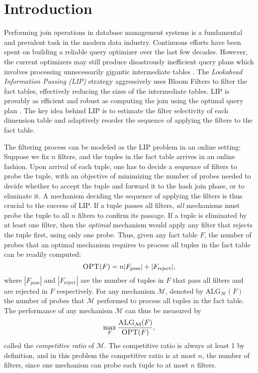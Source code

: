 
\section{Introduction}

Performing join operations in database management systems is a fundamental and prevalent task in the modern data industry. Continuous efforts have been spent on building a reliable query optimizer over the last few decades. However, the current optimizers may still produce disastrously inefficient query plans which involves processing unnecessarily gigantic intermediate tables \cite{leis2015good,rabl2013variations}. The \textit{Lookahead Information Passing (LIP)} strategy aggressively uses Bloom Filters to filter the fact tables, effectively reducing the sizes of the intermediate tables. LIP is provably as efficient and robust as computing the join using the optimal query plan \cite{zhu2017looking}. The key idea behind LIP is to estimate the filter selectivity of each dimension table and adaptively reorder the sequence of applying the filters to the fact table. 


The filtering process can be modeled as the \textsc{LIP} problem in an online setting: Suppose we fix $n$ filters, and the tuples in the fact table arrives in an online fashion. Upon arrival of each tuple, one has to decide a sequence of filters to probe the tuple, with an objective of minimizing the number of probes needed to decide whether to accept the tuple and forward it to the hash join phase, or to eliminate it. A mechanism deciding the sequence of applying the filters is thus crucial to the success of LIP. If a tuple passes all filters, \textit{all} mechanisms must probe the tuple to all $n$ filters to confirm its passage. If a tuple is eliminated by at least one filter, then the \textit{optimal} mechanism would apply any filter that rejects the tuple first, using only one probe. Thus, given any fact table $F$, the number of probes that an optimal mechanism requires to process all tuples in the fact table can be readily computed: 
\[
	\textsc{OPT}(F) = n|F_{\text{pass}}| + |F_{\text{reject}}|,
\]
where $|F_{\text{pass}}|$ and $|F_{\text{reject}}|$ are the number of tuples in $F$ that pass all filters and are rejected in $F$ respectively. For any mechanism $\mathcal{M}$, denoted by \textsc{ALG}$_{\mathcal{M}}(F)$ the number of probes that $\mathcal{M}$ performed to process all tuples in the fact table.  The performance of any mechanism $\mathcal{M}$ can thus be measured by 
\[
	\max_{F}\frac{\textsc{ALG}_{\mathcal{M}}(F)}{\textsc{OPT}(F)},
\]
called the \textit{competitive ratio} of $\mathcal{M}$. The competitive ratio is always at least 1 by definition, and in this problem the competitive ratio is at most $n$, the number of filters, since one mechanism can probe each tuple to at most $n$ filters.


